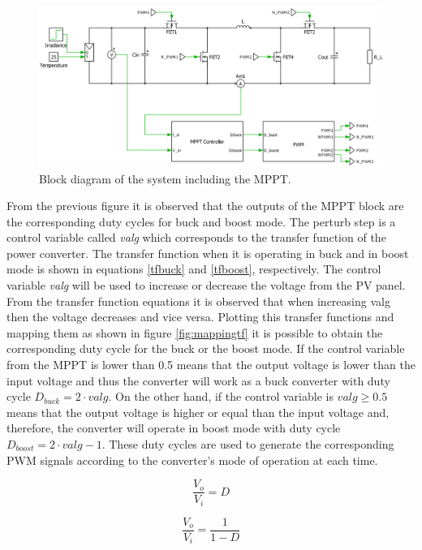 \begin{figure}[H]
	\begin{center}
		\includegraphics[width=1\textwidth]{../Pictures/BD_implementation_POalgorithm}
		\caption{Block diagram of the system including the MPPT.}
		\label{BD_POalgorithm}
	\end{center}	
\end{figure}

From the previous figure it is observed that the outputs of the MPPT block are the corresponding duty cycles for buck and boost mode. The perturb step is a control variable called \textit{valg} which corresponds to the transfer function of the power converter. 
The transfer function when it is operating in buck and in boost mode is shown in equations \ref{tfbuck} and \ref{tfboost}, respectively. 
The control variable \textit{valg} will be used to increase or decrease the voltage from the PV panel. From the transfer function equations it is observed that when increasing valg then the voltage decreases and vice versa.
 Plotting this transfer functions and mapping them as shown in figure \ref{fig:mappingtf} it is possible to obtain the corresponding duty cycle for the buck or the boost mode. If the control variable from the MPPT is lower than 0.5  means that the output voltage is lower than the input voltage and thus the converter will work as a buck converter with duty cycle $D_{buck}=2\cdot valg$. On the other hand, if the control variable is $valg \geq 0.5$ means that the output voltage is higher or equal than the input voltage and, therefore, the converter will operate in boost mode with duty cycle $D_{boost}=2\cdot valg - 1$. These duty cycles are used to generate the corresponding PWM signals according to the converter's mode of operation at each time. 

\vspace{1cm}
\begin{minipage}{0.3\linewidth}
	\begin{equation}	\label{tfbuck}
	\frac{V_o}{V_i} = D
	\end{equation}

\end{minipage}%
\begin{minipage}{0.5\linewidth}	
	\begin{equation}	\label{tfboost}
	\frac{V_o}{V_i}= \frac{1}{1-D}
	\end{equation}

\end{minipage}

